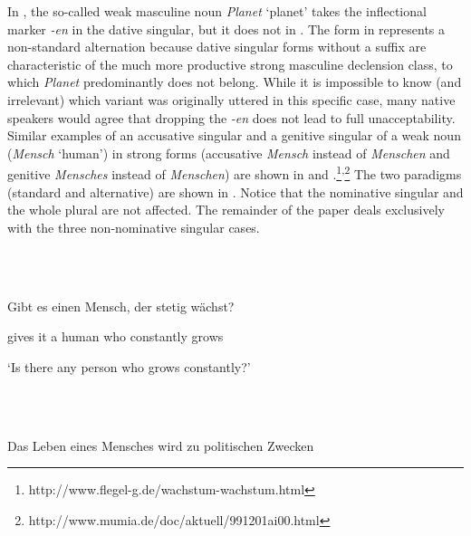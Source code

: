 \begin{styleMoutonTextBetweenExamples}
In , the so-called weak masculine noun \textit{Planet} ‘planet’ takes the inflectional marker \textit{\nobreakdash-en} in the dative singular, but it does not in . The form in  represents a non-standard alternation because dative singular forms without a suffix are characteristic of the much more productive strong masculine declension class, to which \textit{Planet} predominantly does not belong. While it is impossible to know (and irrelevant) which variant was originally uttered in this specific case, many native speakers would agree that dropping the \textit{\nobreakdash-en} does not lead to full unacceptability. Similar examples of an accusative singular and a genitive singular of a weak noun (\textit{Mensch} ‘human’) in strong forms (accusative \textit{Mensch} instead of \textit{Menschen} and genitive \textit{Mensches} instead of \textit{Menschen}) are shown in  and .\footnote{http://www.flegel-g.de/wachstum-wachstum.html}\textsuperscript{,}\footnote{http://www.mumia.de/doc/aktuell/991201ai00.html} The two paradigms (standard and alternative) are shown in . Notice that the nominative singular and the whole plural are not affected. The remainder of the paper deals exclusively with the three non-nominative singular cases.
\end{styleMoutonTextBetweenExamples}

\begin{styleMoutonExample}
\ea%
    \label{ex:key:2}
    \gll\\
        \\
    \glt
    \z

          Gibt  es  einen  Mensch,  der  stetig    wächst?
\end{styleMoutonExample}

\begin{styleMoutonExampleAlpha}
gives  it  a  human  who  constantly  grows
\end{styleMoutonExampleAlpha}

\begin{styleMoutonExampleAlpha}
‘Is there any person who grows constantly?’
\end{styleMoutonExampleAlpha}

\begin{styleMoutonExample}
\ea%
    \label{ex:key:3}
    \gll\\
        \\
    \glt
    \z

          Das  Leben  eines  Mensches  wird    zu  politischen  Zwecken
\end{styleMoutonExample}

